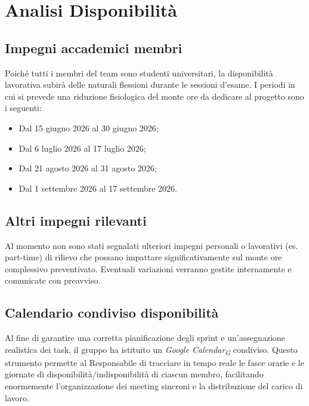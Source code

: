 \documentclass[11pt, a4paper]{article}
\begin{document}
	\newpage
	\section{Analisi Disponibilità}
	
	\subsection{Impegni accademici membri}
	Poiché tutti i membri del team sono studenti universitari, la disponibilità lavorativa subirà delle naturali flessioni durante le sessioni d'esame. I periodi in cui si prevede una riduzione fisiologica del monte ore da dedicare al progetto sono i seguenti:
	\begin{itemize}
		\item Dal 15 giugno 2026 al 30 giugno 2026;
		\item Dal 6 luglio 2026 al 17 luglio 2026;
		\item Dal 21 agosto 2026 al 31 agosto 2026;
		\item Dal 1 settembre 2026 al 17 settembre 2026.
	\end{itemize}
	
	\subsection{Altri impegni rilevanti}
	Al momento non sono stati segnalati ulteriori impegni personali o lavorativi (es. part-time) di rilievo che possano impattare significativamente sul monte ore complessivo preventivato. Eventuali variazioni verranno gestite internamente e comunicate con preavviso.
	
	\subsection{Calendario condiviso disponibilità}
	Al fine di garantire una corretta pianificazione degli sprint e un'assegnazione realistica dei task, il gruppo ha istituito un \textit{Google Calendar\textsubscript{G}} condiviso. Questo strumento permette al Responsabile di tracciare in tempo reale le fasce orarie e le giornate di disponibilità/indisponibilità di ciascun membro, facilitando enormemente l'organizzazione dei meeting sincroni e la distribuzione del carico di lavoro.
	
\end{document}
